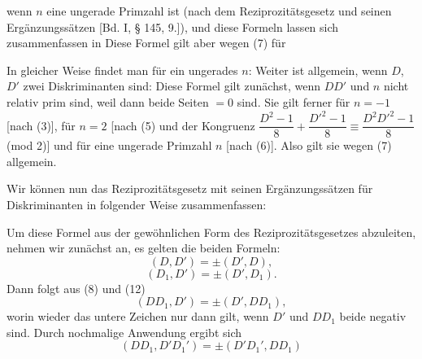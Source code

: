 
wenn $n$ eine ungerade Primzahl ist (nach dem Reziprozitätsgesetz und seinen Ergänzungssätzen [Bd. I, § 145, 9.]), und diese Formeln lassen sich zusammenfassen in
Diese Formel gilt aber wegen (7) für 

In gleicher Weise findet man für ein ungerades $n$:
Weiter ist allgemein, wenn $D$, $D'$ zwei Diskriminanten sind:
Diese Formel gilt zunächst, wenn $DD'$ und $n$ nicht relativ prim sind, weil dann beide Seiten $=0$ sind. Sie gilt ferner für $n=-1$ [nach (3)], für $n=2$ [nach (5) und der Kongruenz $\dfrac{D^2-1}{8}+\dfrac{D'^2-1}{8} \equiv \dfrac{D^2D'^2-1}{8}$ (mod 2)] und für eine ungerade Primzahl $n$ [nach (6)]. Also gilt sie wegen (7) allgemein.

Wir können nun das Reziprozitätsgesetz mit seinen Ergänzungssätzen für Diskriminanten in folgender Weise zusammenfassen:

Um diese Formel aus der gewöhnlichen Form des Reziprozitätsgesetzes abzuleiten, nehmen wir zunächst an, es gelten die beiden Formeln:
\[
(D,D') = \pm(D',D),
\]
\[
(D_1,D') = \pm(D',D_1).
\]
Dann folgt aus (8) und (12)
\[
(DD_1,D') = \pm(D',DD_1),
\]
worin wieder das untere Zeichen nur dann gilt, wenn $D'$ und $DD_1$ beide negativ sind. Durch nochmalige Anwendung ergibt sich
\[
(DD_1,D'D_1') = \pm(D'D_1',DD_1)
\]
